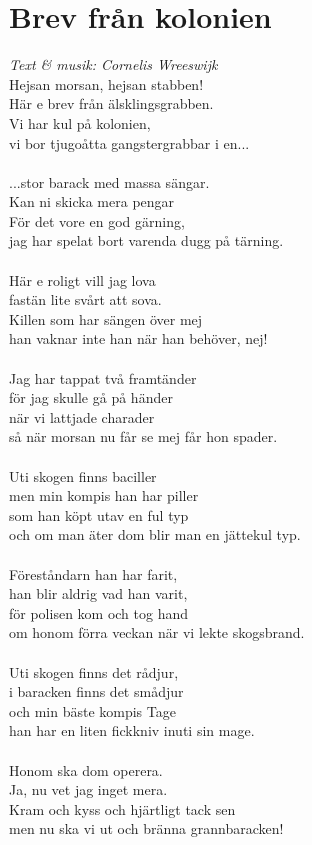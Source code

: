 \section{Brev från kolonien}
\textit{Text & musik: Cornelis Wreeswijk}
\vspace{2mm}\\
Hejsan morsan, hejsan stabben!\\
Här e brev från älsklingsgrabben.\\
Vi har kul på kolonien,\\
vi bor tjugoåtta gangstergrabbar i en...\\
\\
...stor barack med massa sängar.\\
Kan ni skicka mera pengar\\
För det vore en god gärning,\\
jag har spelat bort varenda dugg på tärning.\\
\\
Här e roligt vill jag lova\\
fastän lite svårt att sova.\\
Killen som har sängen över mej\\
han vaknar inte han när han behöver, nej!\\
\\
Jag har tappat två framtänder\\
för jag skulle gå på händer\\
när vi lattjade charader\\
så när morsan nu får se mej får hon spader.\\
\\
Uti skogen finns baciller\\
men min kompis han har piller\\
som han köpt utav en ful typ\\
och om man äter dom blir man en jättekul typ.\\
\\
Föreståndarn han har farit,\\
han blir aldrig vad han varit,\\
för polisen kom och tog hand\\
om honom förra veckan när vi lekte skogsbrand.\\
\\
Uti skogen finns det rådjur,\\
i baracken finns det smådjur\\
och min bäste kompis Tage\\
han har en liten fickkniv inuti sin mage.\\
\\
Honom ska dom operera.\\
Ja, nu vet jag inget mera.\\
Kram och kyss och hjärtligt tack sen\\
men nu ska vi ut och bränna grannbaracken!\\

